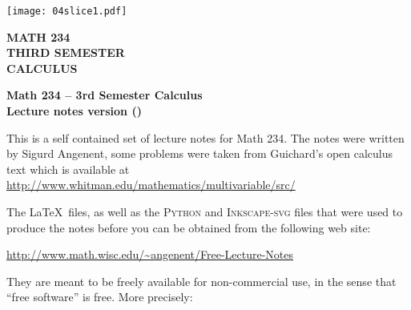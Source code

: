 \null \vfill

\noindent
\texttt{[image: 04slice1.pdf]}

\begin{flushright} \huge\sffamily\bfseries%
  MATH 234 \\
  THIRD SEMESTER \\
  CALCULUS\\[1in]
  \large \semester
\end{flushright}

\vfill \newpage
\vfill

\begin{center}
  \bfseries Math 234 -- 3rd Semester Calculus \\
  Lecture notes version \version (\semester)
\end{center}

\noindent This is a self contained set of lecture notes for Math 234. The
notes were written by Sigurd Angenent, some problems were
taken from Guichard's open calculus text which is available at
\url{http://www.whitman.edu/mathematics/multivariable/src/}

The \LaTeX\ files, as well as the \textsc{Python} and \textsc{Inkscape-svg}
files that were used to produce the notes before you can be obtained from
the following web site:
\begin{center}
  \url{http://www.math.wisc.edu/~angenent/Free-Lecture-Notes}
\end{center}
They are meant to be freely available for non-commercial use, in the sense
that ``free software'' is free. More precisely:

\bigskip

\begin{center}
\end{center}
\vfill
\newpage

